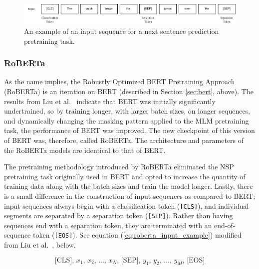 \documentclass[12pt]{article}
\begin{document}
\begin{figure}
    \includegraphics[width=\linewidth]{figures/BERT_NSP_input.png}
    \caption{An example of an input sequence for a next sentence prediction pretraining task.}
    \label{fig:bert_nsp_input_example}
\end{figure}

\subsubsection{RoBERTa}\label{sec:roberta}
As the name implies, the Robustly Optimized BERT Pretraining Approach (RoBERTa) is an iteration on BERT (described in Section \ref{sec:bert}, above).
The results from Liu et al.~\cite{liu_roberta_2019} indicate that BERT was initially significantly undertrained, so by training longer, with larger
batch sizes, on longer sequences, and dynamically changing the masking pattern applied to the MLM pretraining task, the performance of BERT was
improved. The new checkpoint of this version of BERT was, therefore, called RoBERTa. The architecture and parameters of the RoBERTa models are
identical to that of BERT.

The pretraining methodology introduced by RoBERTa eliminated the NSP pretraining task originally used in BERT and opted to increase the quantity of
training data along with the batch sizes and train the model longer. Lastly, there is a small difference in the construction of input sequences as
compared to BERT; input sequences always begin with a classification token (\lstinline|[CLS]|), and individual segments are separated by a separation
token (\lstinline|[SEP]|). Rather than having sequences end with a separation token, they are terminated with an end-of-sequence token
(\lstinline|[EOS]|). See equation (\ref{eq:roberta_input_example}) modified from Liu et al.~\cite{liu_roberta_2019}, below.

\begin{equation}\label{eq:roberta_input_example}
    \mbox{[CLS], $x_1$, $x_2$, ..., $x_N$, [SEP], $y_1$, $y_2$, ..., $y_M$, [EOS]}
\end{equation}
\end{document}
